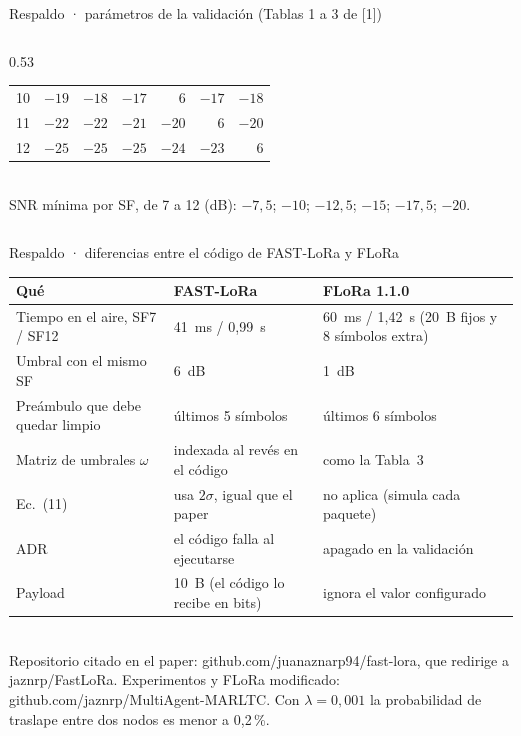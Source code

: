 \documentclass[aspectratio=169,11pt]{beamer}
\begin{document}
\begin{frame}{Respaldo · parámetros de la validación (Tablas 1 a 3 de [1])}
\begin{columns}[T,onlytextwidth]
\begin{column}{0.53\textwidth}
\begin{tabular}{@{}c|rrrrrr@{}}
        10  & $-19$ & $-18$ & $-17$ & \textcolor{warm}{6} & $-17$ & $-18$ \\
        11  & $-22$ & $-22$ & $-21$ & $-20$ & \textcolor{warm}{6} & $-20$ \\
        12  & $-25$ & $-25$ & $-25$ & $-24$ & $-23$ & \textcolor{warm}{6} \\
      \end{tabular}\\[3mm]
      {\footnotesize SNR mínima por SF, de 7 a 12 (dB): $-7{,}5$; $-10$; $-12{,}5$; $-15$; $-17{,}5$; $-20$.}
    \end{column}
  \end{columns}
\end{frame}

\begin{frame}{Respaldo · diferencias entre el código de FAST-LoRa y FLoRa}
  \vspace{1mm}
  \footnotesize
  \renewcommand{\arraystretch}{1.25}
  \begin{tabular}{@{}p{4.3cm}p{4.2cm}p{4.9cm}@{}}
    \toprule
    \textcolor{muted}{Qué} & \textcolor{muted}{FAST-LoRa} & \textcolor{muted}{FLoRa 1.1.0} \\ \midrule
    Tiempo en el aire, SF7 / SF12 & 41~ms / 0,99~s & 60~ms / 1,42~s (20~B fijos y 8 símbolos extra) \\
    Umbral con el mismo SF & 6~dB & 1~dB \\
    Preámbulo que debe quedar limpio & últimos 5 símbolos & últimos 6 símbolos \\
    Matriz de umbrales $\omega$ & indexada al revés en el código & como la Tabla~3 \\
    Ec.~(11) & usa $2\sigma$, igual que el paper & no aplica (simula cada paquete) \\
    ADR & el código falla al ejecutarse & apagado en la validación \\
    Payload & 10~B (el código lo recibe en bits) & ignora el valor configurado \\
    \bottomrule
  \end{tabular}\\[3mm]
  {\scriptsize\textcolor{muted}{Repositorio citado en el paper: github.com/juanaznarp94/fast-lora, que redirige a jaznrp/FastLoRa. Experimentos y FLoRa modificado:
  github.com/jaznrp/MultiAgent-MARLTC. Con $\lambda=0{,}001$ la probabilidad de traslape entre dos nodos es menor a 0,2\,\%.}}
\end{frame}
\end{document}
